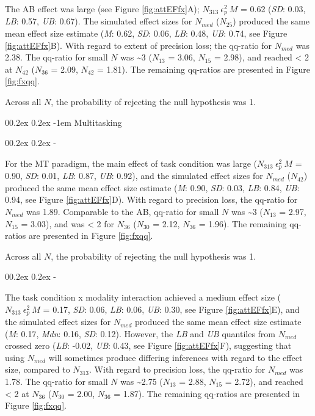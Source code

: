 \documentclass[
  man]{apa6}
\makeatletter
\let\oldparagraph\paragraph
\renewcommand{\paragraph}[1]{\oldparagraph{#1}\mbox{}}
\let\oldsubparagraph\subparagraph
\renewcommand{\subparagraph}[1]{\oldsubparagraph{#1}\mbox{}}
\renewcommand{\paragraph}{\@startsection{paragraph}{4}{\parindent}%
  {0\baselineskip \@plus 0.2ex \@minus 0.2ex}%
  {-1em}%
  {\normalfont\normalsize\bfseries\itshape\typesectitle}}
\renewcommand{\subparagraph}[1]{\@startsection{subparagraph}{5}{1em}%
  {0\baselineskip \@plus 0.2ex \@minus 0.2ex}%
  {-\z@\relax}%
  {\normalfont\normalsize\itshape\hspace{\parindent}{#1}\textit{\addperi}}{\relax}}
\makeatother
\begin{document}
The AB effect was large (see Figure \ref{fig:attEFfx}A); \(N_{313}\ \epsilon_{p}^2\ M\) = 0.62 (\emph{SD}: 0.03, \emph{LB}: 0.57, \emph{UB}: 0.67). The simulated effect sizes for \(N_{med}\) (\(N_{25}\)) produced the same mean effect size estimate (\emph{M}: 0.62, \emph{SD}: 0.06, \emph{LB}: 0.48, \emph{UB}: 0.74, see Figure \ref{fig:attEFfx}B). With regard to extent of precision loss; the qq-ratio for \(N_{med}\) was 2.38. The qq-ratio for small \(N\) was \textasciitilde3 (\(N_{13}\) = 3.06, \(N_{15}\) = 2.98), and reached \textless{} 2 at \(N_{42}\) (\(N_{36}\) = 2.09, \(N_{42}\) = 1.81). The remaining qq-ratios are presented in Figure \ref{fig:fxqq}.

Across all \(N\), the probability of rejecting the null hypothesis was 1.

\hypertarget{multitasking-2}{%
\paragraph{Multitasking}\label{multitasking-2}}

\hypertarget{main-effect-of-task-condition}{%
\subparagraph{Main effect of task condition}\label{main-effect-of-task-condition}}

For the MT paradigm, the main effect of task condition was large (\(N_{313}\ \epsilon_{p}^2\ M\) = 0.90, \emph{SD}: 0.01, \emph{LB}: 0.87, \emph{UB}: 0.92), and the simulated effect sizes for \(N_{med}\) (\(N_{42}\)) produced the same mean effect size estimate (\emph{M}: 0.90, \emph{SD}: 0.03, \emph{LB}: 0.84, \emph{UB}: 0.94, see Figure \ref{fig:attEFfx}D). With regard to precision loss, the qq-ratio for \(N_{med}\) was 1.89. Comparable to the AB, qq-ratio for small \(N\) was \textasciitilde3 (\(N_{13}\) = 2.97, \(N_{15}\) = 3.03), and was \textless{} 2 for \(N_{36}\) (\(N_{30}\) = 2.12, \(N_{36}\) = 1.96). The remaining qq-ratios are presented in Figure \ref{fig:fxqq}.

Across all \(N\), the probability of rejecting the null hypothesis was 1.

\hypertarget{task-condition-by-modality-interaction}{%
\subparagraph{Task condition by modality interaction}\label{task-condition-by-modality-interaction}}

The task condition x modality interaction achieved a medium effect size (\(N_{313}\ \epsilon_{p}^2\ M\) = 0.17, \emph{SD}: 0.06, \emph{LB}: 0.06, \emph{UB}: 0.30, see Figure \ref{fig:attEFfx}E), and the simulated effect sizes for \(N_{med}\) produced the same mean effect size estimate (\emph{M}: 0.17, \emph{Mdn}: 0.16, \emph{SD}: 0.12). However, the \emph{LB} and \emph{UB} quantiles from \(N_{med}\) crossed zero (\emph{LB}: -0.02, \emph{UB}: 0.43, see Figure \ref{fig:attEFfx}F), suggesting that using \(N_{med}\) will sometimes produce differing inferences with regard to the effect size, compared to \(N_{313}\). With regard to precision loss, the qq-ratio for \(N_{med}\) was 1.78. The qq-ratio for small \(N\) was \textasciitilde2.75 (\(N_{13}\) = 2.88, \(N_{15}\) = 2.72), and reached \textless{} 2 at \(N_{36}\) (\(N_{30}\) = 2.00, \(N_{36}\) = 1.87). The remaining qq-ratios are presented in Figure \ref{fig:fxqq}.
\end{document}
